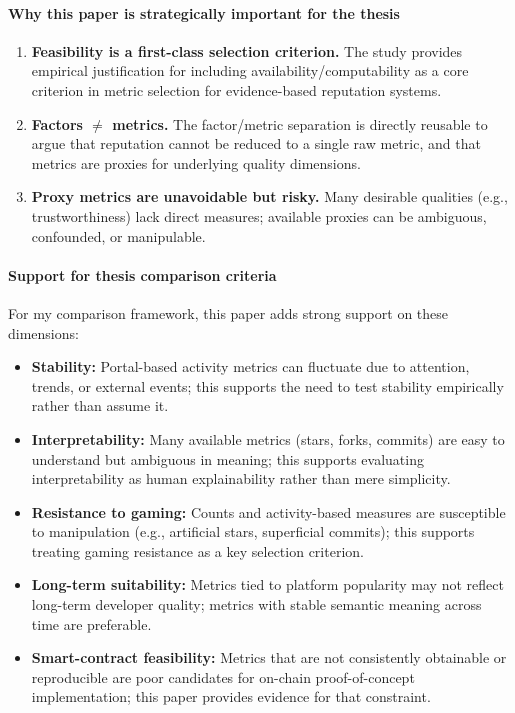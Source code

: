 \documentclass[11pt,a4paper]{article}
\begin{document}
\paragraph{Why this paper is strategically important for the thesis}
\begin{enumerate}[leftmargin=*]
  \item \textbf{Feasibility is a first-class selection criterion.} The study provides empirical justification for including availability/computability as a core criterion in metric selection for evidence-based reputation systems.
  \item \textbf{Factors $\neq$ metrics.} The factor/metric separation is directly reusable to argue that reputation cannot be reduced to a single raw metric, and that metrics are proxies for underlying quality dimensions.
  \item \textbf{Proxy metrics are unavoidable but risky.} Many desirable qualities (e.g., trustworthiness) lack direct measures; available proxies can be ambiguous, confounded, or manipulable.
\end{enumerate}

\paragraph{Support for thesis comparison criteria}
For my comparison framework, this paper adds strong support on these dimensions:
\begin{itemize}[leftmargin=*]
  \item \textbf{Stability:} Portal-based activity metrics can fluctuate due to attention, trends, or external events; this supports the need to test stability empirically rather than assume it.
  \item \textbf{Interpretability:} Many available metrics (stars, forks, commits) are easy to understand but ambiguous in meaning; this supports evaluating interpretability as human explainability rather than mere simplicity.
  \item \textbf{Resistance to gaming:} Counts and activity-based measures are susceptible to manipulation (e.g., artificial stars, superficial commits); this supports treating gaming resistance as a key selection criterion.
  \item \textbf{Long-term suitability:} Metrics tied to platform popularity may not reflect long-term developer quality; metrics with stable semantic meaning across time are preferable.
  \item \textbf{Smart-contract feasibility:} Metrics that are not consistently obtainable or reproducible are poor candidates for on-chain proof-of-concept implementation; this paper provides evidence for that constraint.
\end{itemize}
\end{document}
